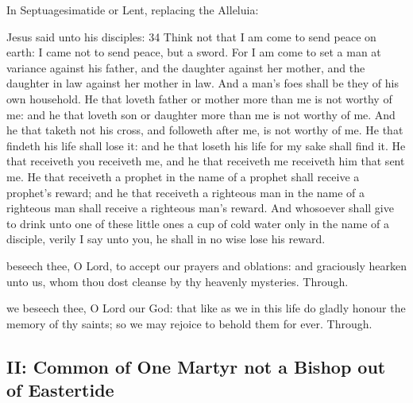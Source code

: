 \begin{rubric}
{In Septuagesimatide or Lent, replacing the Alleluia:}
\end{rubric}

\vspace{-1ex}


 Jesus said unto his disciples: 34 Think not that I am come to send peace on earth: I came not to send peace, but a sword. For I am come to set a man at variance against his father, and the daughter against her mother, and the daughter in law against her mother in law. And a man's foes shall be they of his own household. He that loveth father or mother more than me is not worthy of me: and he that loveth son or daughter more than me is not worthy of me. And he that taketh not his cross, and followeth after me, is not worthy of me. He that findeth his life shall lose it: and he that loseth his life for my sake shall find it. He that receiveth you receiveth me, and he that receiveth me receiveth him that sent me. He that receiveth a prophet in the name of a prophet shall receive a prophet's reward; and he that receiveth a righteous man in the name of a righteous man shall receive a righteous man's reward. And whosoever shall give to drink unto one of these little ones a cup of cold water only in the name of a disciple, verily I say unto you, he shall in no wise lose his reward.


\secret\label{CommonMartyrNotBishopISecret}
 beseech thee, O Lord, to accept our prayers and oblations: and graciously hearken unto us, whom thou dost cleanse by thy heavenly mysteries. Through.


\postcommunion\label{CommonMartyrNotBishopIPostcommunion}
 we beseech thee, O Lord our God: that like as we in this life do gladly honour the memory of thy saints; so we may rejoice to behold them for ever. Through.


\subsection{II: Common of One Martyr not a Bishop out of Eastertide}\label{CommonMartyrNotBishopII}

